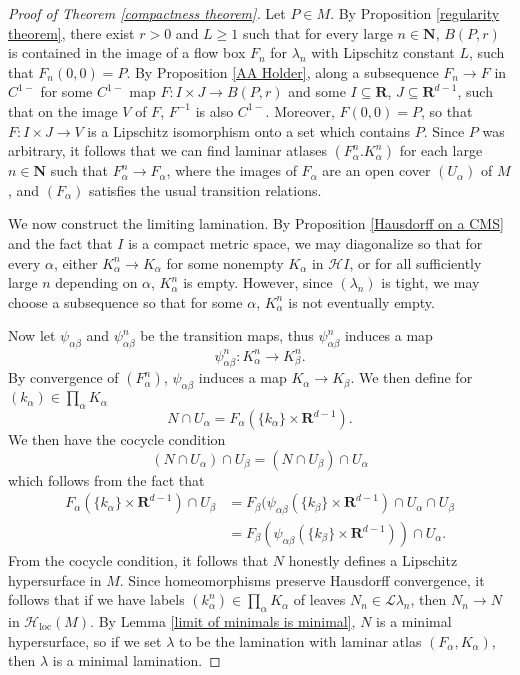 \documentclass[reqno,11pt]{amsart}
\newcommand{\NN}{\mathbf{N}}
\newcommand{\RR}{\mathbf{R}}
\newcommand{\Leaves}{\mathscr L}
\newcommand{\Hypspace}{\mathscr H}
\newcommand{\loc}{\mathrm{loc}}
\theoremstyle{definition}
\numberwithin{equation}{section}
\begin{document}
\begin{proof}[Proof of Theorem \ref{compactness theorem}]
Let $P \in M$.
By Proposition \ref{regularity theorem}, there exist $r > 0$ and $L \geq 1$ such that for every large $n \in \NN$, $B(P, r)$ is contained in the image of a flow box $F_n$ for $\lambda_n$ with Lipschitz constant $L$, such that $F_n(0, 0) = P$.
By Proposition \ref{AA Holder}, along a subsequence $F_n \to F$ in $C^{1-}$ for some $C^{1-}$ map $F: I \times J \to B(P, r)$ and some $I \subseteq \RR$, $J \subseteq \RR^{d - 1}$, such that on the image $V$ of $F$, $F^{-1}$ is also $C^{1-}$.
Moreover, $F(0, 0) = P$, so that $F: I \times J \to V$ is a Lipschitz isomorphism onto a set which contains $P$.
Since $P$ was arbitrary, it follows that we can find laminar atlases $(F_\alpha^n. K_\alpha^n)$ for each large $n \in \NN$ such that $F_\alpha^n \to F_\alpha$, where the images of $F_\alpha$ are an open cover $(U_\alpha)$ of $M$, and $(F_\alpha)$ satisfies the usual transition relations.

We now construct the limiting lamination.
By Proposition \ref{Hausdorff on a CMS} and the fact that $I$ is a compact metric space, we may diagonalize so that for every $\alpha$, either $K^n_\alpha \to K_\alpha$ for some nonempty $K_\alpha$ in $\Hypspace I$, or for all sufficiently large $n$ depending on $\alpha$, $K_\alpha^n$ is empty.
However, since $(\lambda_n)$ is tight, we may choose a subsequence so that for some $\alpha$, $K_\alpha^n$ is not eventually empty.

Now let $\psi_{\alpha \beta}$ and $\psi_{\alpha \beta}^n$ be the transition maps, thus $\psi_{\alpha \beta}^n$ induces a map
$$\psi_{\alpha \beta}^n: K_\alpha^n \to K_\beta^n.$$
By convergence of $(F_\alpha^n)$, $\psi_{\alpha \beta}$ induces a map $K_\alpha \to K_\beta$.
We then define for $(k_\alpha) \in \prod_\alpha K_\alpha$
$$N \cap U_\alpha = F_\alpha(\{k_\alpha\} \times \RR^{d - 1}).$$
We then have the cocycle condition
$$(N \cap U_\alpha) \cap U_\beta = (N \cap U_\beta) \cap U_\alpha$$
which follows from the fact that
\begin{align*}
F_\alpha(\{k_\alpha\} \times \RR^{d - 1}) \cap U_\beta
&= F_\beta(\psi_{\alpha \beta}(\{k_\beta\} \times \RR^{d - 1}) \cap U_\alpha \cap U_\beta \\
&= F_\beta(\psi_{\alpha \beta}(\{k_\beta\} \times \RR^{d - 1})) \cap U_\alpha.
\end{align*}
From the cocycle condition, it follows that $N$ honestly defines a Lipschitz hypersurface in $M$.
Since homeomorphisms preserve Hausdorff convergence, it follows that if we have labels $(k_\alpha^n) \in \prod_\alpha K_\alpha$ of leaves $N_n \in \Leaves \lambda_n$, then $N_n \to N$ in $\Hypspace_\loc(M)$.
By Lemma \ref{limit of minimals is minimal}, $N$ is a minimal hypersurface, so if we set $\lambda$ to be the lamination with laminar atlas $(F_\alpha, K_\alpha)$, then $\lambda$ is a minimal lamination.


\end{proof}
\end{document}

